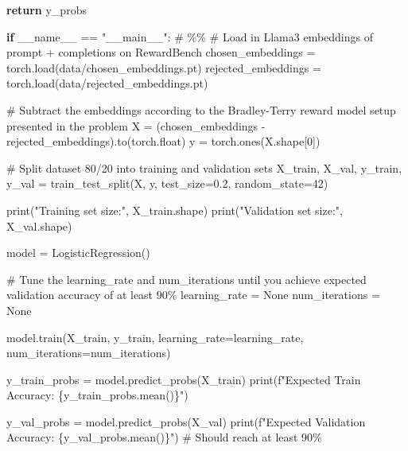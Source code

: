 \documentclass[
  letterpaper,
  numbers=noenddot,
  DIV=11,
  oneside]{scrreprt}
\newenvironment{Shaded}{\begin{snugshade}}{\end{snugshade}}
\newcommand{\BuiltInTok}[1]{\textcolor[rgb]{0.00,0.23,0.31}{#1}}
\newcommand{\CommentTok}[1]{\textcolor[rgb]{0.37,0.37,0.37}{#1}}
\newcommand{\ControlFlowTok}[1]{\textcolor[rgb]{0.00,0.23,0.31}{\textbf{#1}}}
\newcommand{\DecValTok}[1]{\textcolor[rgb]{0.68,0.00,0.00}{#1}}
\newcommand{\FloatTok}[1]{\textcolor[rgb]{0.68,0.00,0.00}{#1}}
\newcommand{\NormalTok}[1]{\textcolor[rgb]{0.00,0.23,0.31}{#1}}
\newcommand{\OperatorTok}[1]{\textcolor[rgb]{0.37,0.37,0.37}{#1}}
\newcommand{\SpecialCharTok}[1]{\textcolor[rgb]{0.37,0.37,0.37}{#1}}
\newcommand{\SpecialStringTok}[1]{\textcolor[rgb]{0.13,0.47,0.30}{#1}}
\newcommand{\StringTok}[1]{\textcolor[rgb]{0.13,0.47,0.30}{#1}}
\newcommand{\VariableTok}[1]{\textcolor[rgb]{0.07,0.07,0.07}{#1}}
\theoremstyle{remark}
\begin{document}
\begin{Shaded}
\begin{Highlighting}[numbers=left,,]
        \ControlFlowTok{return}\NormalTok{ y\_probs}


\ControlFlowTok{if} \VariableTok{\_\_name\_\_} \OperatorTok{==} \StringTok{"\_\_main\_\_"}\NormalTok{:}
    \CommentTok{\# \%\%}
    \CommentTok{\# Load in Llama3 embeddings of prompt + completions on RewardBench}
\NormalTok{    chosen\_embeddings }\OperatorTok{=}\NormalTok{ torch.load(}\StringTok{\textquotesingle{}data/chosen\_embeddings.pt\textquotesingle{}}\NormalTok{)}
\NormalTok{    rejected\_embeddings }\OperatorTok{=}\NormalTok{ torch.load(}\StringTok{\textquotesingle{}data/rejected\_embeddings.pt\textquotesingle{}}\NormalTok{)}

    \CommentTok{\# Subtract the embeddings according to the Bradley{-}Terry reward model setup presented in the problem }
\NormalTok{    X }\OperatorTok{=}\NormalTok{ (chosen\_embeddings }\OperatorTok{{-}}\NormalTok{ rejected\_embeddings).to(torch.}\BuiltInTok{float}\NormalTok{)}
\NormalTok{    y }\OperatorTok{=}\NormalTok{ torch.ones(X.shape[}\DecValTok{0}\NormalTok{])}

    \CommentTok{\# Split dataset 80/20 into training and validation sets}
\NormalTok{    X\_train, X\_val, y\_train, y\_val }\OperatorTok{=}\NormalTok{ train\_test\_split(X, y, test\_size}\OperatorTok{=}\FloatTok{0.2}\NormalTok{, random\_state}\OperatorTok{=}\DecValTok{42}\NormalTok{)  }

    \BuiltInTok{print}\NormalTok{(}\StringTok{"Training set size:"}\NormalTok{, X\_train.shape)}
    \BuiltInTok{print}\NormalTok{(}\StringTok{"Validation set size:"}\NormalTok{, X\_val.shape)}

\NormalTok{    model }\OperatorTok{=}\NormalTok{ LogisticRegression()}

    \CommentTok{\# Tune the learning\_rate and num\_iterations until you achieve expected validation accuracy of at least 90\%}
\NormalTok{    learning\_rate }\OperatorTok{=} \VariableTok{None}
\NormalTok{    num\_iterations }\OperatorTok{=} \VariableTok{None}

\NormalTok{    model.train(X\_train, y\_train, learning\_rate}\OperatorTok{=}\NormalTok{learning\_rate, num\_iterations}\OperatorTok{=}\NormalTok{num\_iterations)}

\NormalTok{    y\_train\_probs }\OperatorTok{=}\NormalTok{ model.predict\_probs(X\_train)}
    \BuiltInTok{print}\NormalTok{(}\SpecialStringTok{f"Expected Train Accuracy: }\SpecialCharTok{\{}\NormalTok{y\_train\_probs}\SpecialCharTok{.}\NormalTok{mean()}\SpecialCharTok{\}}\SpecialStringTok{"}\NormalTok{)}

\NormalTok{    y\_val\_probs }\OperatorTok{=}\NormalTok{ model.predict\_probs(X\_val)}
    \BuiltInTok{print}\NormalTok{(}\SpecialStringTok{f"Expected Validation Accuracy: }\SpecialCharTok{\{}\NormalTok{y\_val\_probs}\SpecialCharTok{.}\NormalTok{mean()}\SpecialCharTok{\}}\SpecialStringTok{"}\NormalTok{) }\CommentTok{\# Should reach at least 90\%}
\end{Highlighting}
\end{Shaded}
\end{document}
